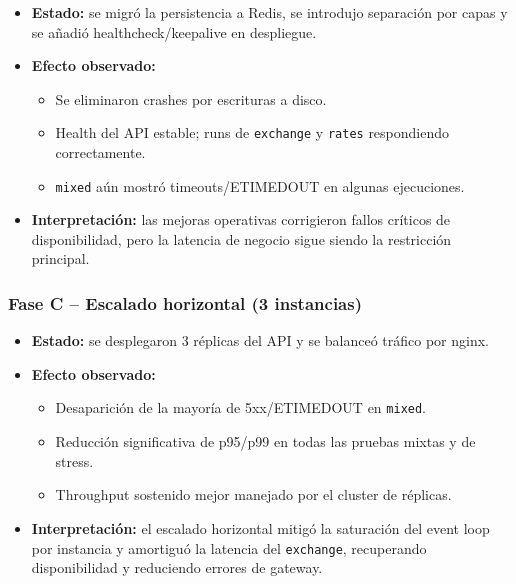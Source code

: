 \begin{itemize}[leftmargin=*]
    \item \textbf{Estado:} se migró la persistencia a Redis, se introdujo separación por capas y se añadió healthcheck/keepalive en despliegue.

    \item \textbf{Efecto observado:}
    \begin{itemize}[leftmargin=2em]
        \item Se eliminaron crashes por escrituras a disco.
        \item Health del API estable; runs de \texttt{exchange} y \texttt{rates} respondiendo correctamente.
        \item \texttt{mixed} aún mostró timeouts/ETIMEDOUT en algunas ejecuciones.
    \end{itemize}

    \item \textbf{Interpretación:} las mejoras operativas corrigieron fallos críticos de disponibilidad, pero la latencia de negocio sigue siendo la restricción principal.
\end{itemize}

\subsubsection{Fase C -- Escalado horizontal (3 instancias)}

\begin{itemize}[leftmargin=*]
    \item \textbf{Estado:} se desplegaron 3 réplicas del API y se balanceó tráfico por nginx.

    \item \textbf{Efecto observado:}
    \begin{itemize}[leftmargin=2em]
        \item Desaparición de la mayoría de 5xx/ETIMEDOUT en \texttt{mixed}.
        \item Reducción significativa de p95/p99 en todas las pruebas mixtas y de stress.
        \item Throughput sostenido mejor manejado por el cluster de réplicas.
    \end{itemize}

    \item \textbf{Interpretación:} el escalado horizontal mitigó la saturación del event loop por instancia y amortiguó la latencia del \texttt{exchange}, recuperando disponibilidad y reduciendo errores de gateway.
\end{itemize}

